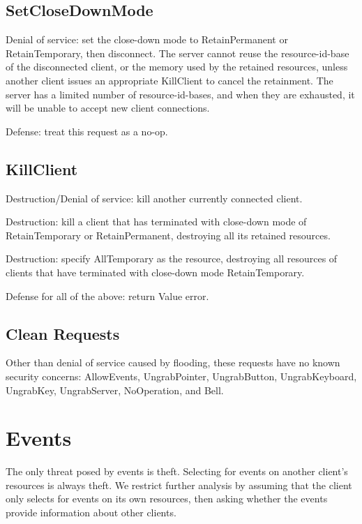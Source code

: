 \documentclass{article}
\begin{document}
\subsection{SetCloseDownMode}

Denial of service: set the close-down mode to RetainPermanent or
RetainTemporary, then disconnect.  The server cannot reuse the
resource-id-base of the disconnected client, or the memory used by the
retained resources, unless another client issues an appropriate
KillClient to cancel the retainment.  The server has a limited number
of resource-id-bases, and when they are exhausted, it will be unable
to accept new client connections.

Defense: treat this request as a no-op.


\subsection{KillClient}

Destruction/Denial of service: kill another currently connected
client.

Destruction: kill a client that has terminated with close-down mode
of RetainTemporary or RetainPermanent, destroying all its retained
resources.

Destruction: specify AllTemporary as the resource, destroying all
resources of clients that have terminated with close-down mode
RetainTemporary.

Defense for all of the above: return Value error.



\subsection{Clean Requests}

Other than denial of service caused by flooding, these requests have
no known security concerns: AllowEvents, UngrabPointer, UngrabButton,
UngrabKeyboard, UngrabKey, UngrabServer, NoOperation, and Bell.



\section{Events}

The only threat posed by events is theft.  Selecting for events on
another client's resources is always theft.  We restrict further
analysis by assuming that the client only selects for events on its
own resources, then asking whether the events provide information
about other clients.
\end{document}
